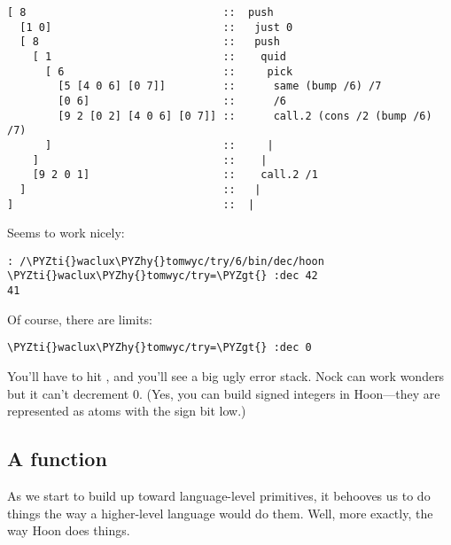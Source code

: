 \begin{framed_shaded}
\begin{Verbatim}[fontsize=\relsize{-2.5},fontseries=b,commandchars=\\\{\}]
[ 8                               ::  push
  [1 0]                           ::   just 0
  [ 8                             ::   push
    [ 1                           ::    quid
      [ 6                         ::     pick
        [5 [4 0 6] [0 7]]         ::      same (bump /6) /7
        [0 6]                     ::      /6
        [9 2 [0 2] [4 0 6] [0 7]] ::      call.2 (cons /2 (bump /6) /7)
      ]                           ::     |
    ]                             ::    |
    [9 2 0 1]                     ::    call.2 /1
  ]                               ::   |
]                                 ::  |
\end{Verbatim}
\end{framed_shaded}

Seems to work nicely:

\begin{framed_shaded}
\begin{Verbatim}[fontsize=\relsize{-2.5},fontseries=b,commandchars=\\\{\}]
: /\PYZti{}waclux\PYZhy{}tomwyc/try/6/bin/dec/hoon
\PYZti{}waclux\PYZhy{}tomwyc/try=\PYZgt{} :dec 42
41
\end{Verbatim}
\end{framed_shaded}

Of course, there are limits:

\begin{framed_shaded}
\begin{Verbatim}[fontsize=\relsize{-2.5},fontseries=b,commandchars=\\\{\}]
\PYZti{}waclux\PYZhy{}tomwyc/try=\PYZgt{} :dec 0
\end{Verbatim}
\end{framed_shaded}

You'll have to hit , and you'll see a big ugly error stack.
Nock can work wonders but it can't decrement 0.  (Yes, you can
build signed integers in Hoon---they are represented as atoms
with the sign bit low.)

\subsection{A function}

As we start to build up toward language-level primitives, it
behooves us to do things the way a higher-level language would do
them.  Well, more exactly, the way Hoon does things.

